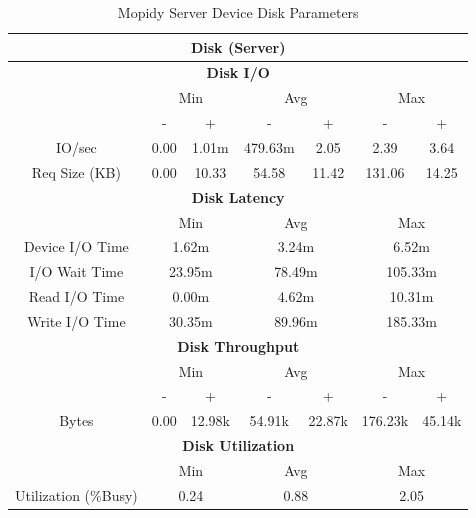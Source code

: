 \documentclass[11pt,a4paper]{scrreprt}
\begin{document}
\begin{table}[H]
\centering
    \begin{tabular}{||c|c|c|c|c|c|c||}
    \hline
    \multicolumn{7}{|c|}{\textbf{Disk (Server)}} \\
    \hline
    \multicolumn{7}{|c|}{\textbf{Disk I/O}} \\
    \hline\hline
      & \multicolumn{2}{|c|}{Min} & \multicolumn{2}{|c|}{Avg} & \multicolumn{2}{|c|}{Max} \\
    \hline
      & - & + & - & + & - & + \\
    \hline
    IO/sec & 0.00 & 1.01m & 479.63m & 2.05 & 2.39 & 3.64 \\
    \hline
    Req Size (KB) & 0.00 & 10.33 & 54.58 & 11.42 & 131.06 & 14.25 \\
    \hline\hline
    \multicolumn{7}{|c|}{\textbf{Disk Latency}} \\
    \hline\hline
      & \multicolumn{2}{|c|}{Min} & \multicolumn{2}{|c|}{Avg} & \multicolumn{2}{|c|}{Max} \\
    \hline
    Device I/O Time  & \multicolumn{2}{|c|}{1.62m} & \multicolumn{2}{|c|}{3.24m} & \multicolumn{2}{|c|}{6.52m} \\
    \hline
    I/O Wait Time  & \multicolumn{2}{|c|}{23.95m} & \multicolumn{2}{|c|}{78.49m} & \multicolumn{2}{|c|}{105.33m} \\
    \hline
    Read I/O Time  & \multicolumn{2}{|c|}{0.00m} & \multicolumn{2}{|c|}{4.62m} & \multicolumn{2}{|c|}{10.31m} \\
    \hline
    Write I/O Time  & \multicolumn{2}{|c|}{30.35m} & \multicolumn{2}{|c|}{89.96m} & \multicolumn{2}{|c|}{185.33m} \\
    \hline\hline
    \multicolumn{7}{|c|}{\textbf{Disk Throughput}} \\
    \hline\hline
      & \multicolumn{2}{|c|}{Min} & \multicolumn{2}{|c|}{Avg} & \multicolumn{2}{|c|}{Max} \\
    \hline
      & - & + & - & + & - & + \\
    \hline
    Bytes & 0.00 & 12.98k & 54.91k & 22.87k & 176.23k & 45.14k \\
    \hline\hline
    \multicolumn{7}{|c|}{\textbf{Disk Utilization}} \\
    \hline\hline
      & \multicolumn{2}{|c|}{Min} & \multicolumn{2}{|c|}{Avg} & \multicolumn{2}{|c|}{Max} \\
    \hline
    Utilization (\%Busy)  & \multicolumn{2}{|c|}{0.24} & \multicolumn{2}{|c|}{0.88} & \multicolumn{2}{|c|}{2.05} \\
    \hline\hline
    \end{tabular}
    \caption{Mopidy Server Device Disk Parameters}
    \label{MopidyserverDiskTab}
\end{table}
\end{document}
